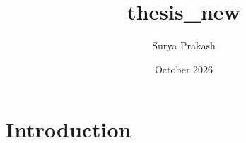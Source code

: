 \documentclass{article}
\title{thesis_new}
\author{Surya Prakash}
\date{October 2026}
\begin{document}
\maketitle

\section{Introduction}
\end{document}
